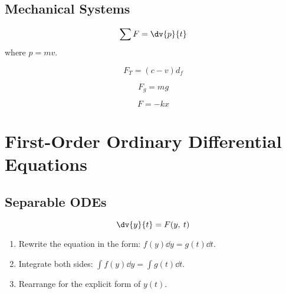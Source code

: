 \documentclass{article}
\begin{document}
\subsection{Mechanical Systems}
\begin{theorem}
    \begin{equation*}
        \sum F = \dv{p}{t}
    \end{equation*}
    where $p = mv$.
\end{theorem}
\begin{theorem}
    \begin{equation*}
        F_T = (c - v) d_f
    \end{equation*}
\end{theorem}
\begin{theorem}
    \begin{equation*}
        F_g = mg
    \end{equation*}
\end{theorem}
\begin{theorem}
    \begin{equation*}
        F = -kx
    \end{equation*}
\end{theorem}
\section{First-Order Ordinary Differential Equations}
\subsection{Separable ODEs}
\begin{equation*}
    \dv{y}{t} = F(y,\: t)
\end{equation*}
\begin{enumerate}
    \item Rewrite the equation in the form: $f(y)\dd{y} = g(t)\dd{t}$.
    \item Integrate both sides: $\int f(y)\dd{y} = \int g(t)\dd{t}$.
    \item Rearrange for the explicit form of $y(t)$.
\end{enumerate}
\end{document}
